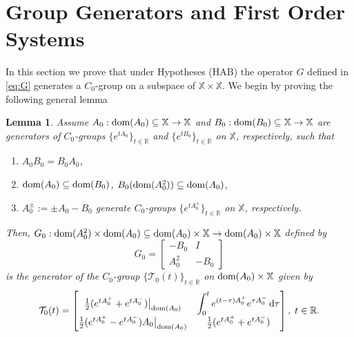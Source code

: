 \documentclass[11pt]{amsart}
\numberwithin{equation}{section}
\newcommand\R{\mathbb R}
\newcommand{\RR}{{\mathbb R}}
\newcommand{\rmd}{{\mathrm{d}}}
\newtheorem{lemma}[theorem]{Lemma}
\theoremstyle{remark}
\theoremstyle{definition}
\newcommand\cT{{\mathcal T}}
\newcommand\bX{{\mathbb X}}
\newcommand{\dom}{\text{\rm{dom}}}
\begin{document}
\section{Group Generators and First Order Systems}\label{s2}
In this section we prove that under Hypotheses (HAB) the operator $G$ defined in \eqref{eq:G} generates a $C_0$-group on a subspace of $\bX\times\bX$. We begin by proving the following general lemma
\begin{lemma}\label{l2.1}
	Assume $A_0:\dom(A_0)\subseteq\bX\to\bX$ and $B_0:\dom(B_0)\subseteq\bX\to\bX$ are generators
	of $C_0$-groups $\{e^{tA_0}\}_{t\in\R}$ and $\{e^{tB_0}\}_{t\in\R}$ on $\bX$, respectively, such that
	\begin{enumerate}
		\item[(i)] $A_0 B_0 = B_0 A_0$,
		\item[(ii)] $\dom(A_0)\subseteq\dom(B_0)$, $B_0(\dom(A_0^2))\subseteq\dom(A_0)$,
		\item[(iii)] $A_0^\pm := \pm A_0 - B_0$ generate $C_0$-groups $\{e^{tA_0^\pm}\}_{t\in\R}$ on $\bX$, respectively.
	\end{enumerate}
	Then, $G_0:\dom(A_0^2)\times\dom(A_0)\subseteq\dom(A_0)\times \bX\to\dom(A_0)\times \bX$ defined by
	\begin{equation}\label{eq:3}
		G_0 = \begin{bmatrix} -B_0 & I \\ A_0^2 & -B_0 \end{bmatrix}
	\end{equation}
	is the generator of the $C_0$-group $\{\cT_0(t)\}_{t\in\R}$ on $\dom(A_0)\times\bX$ given by
\begin{equation}\label{eq:4}
\cT_0(t) = \begin{bmatrix}
\tfrac{1}{2}(e^{tA_0^+}+e^{tA_0^-})\big|_{\dom(A_0)} &
\displaystyle\int_0^t e^{(t-\tau)A_0^+}e^{\tau A_0^-}\,\rmd\tau \\
\tfrac{1}{2}(e^{tA_0^+}-e^{tA_0^-})A_0\big|_{\dom(A_0)} &
\tfrac{1}{2}(e^{tA_0^+}+e^{tA_0^-})
\end{bmatrix},\; t\in\RR.
\end{equation}
\end{lemma} 
\end{document}

